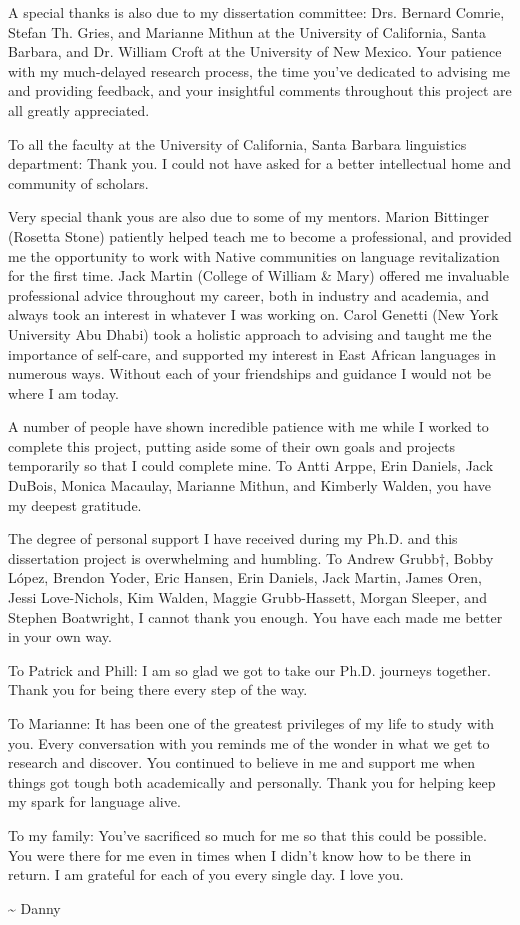 A special thanks is also due to my dissertation committee: Drs. Bernard Comrie, Stefan Th. Gries, and Marianne Mithun at the University of California, Santa Barbara, and Dr. William Croft at the University of New Mexico. Your patience with my much-delayed research process, the time you've dedicated to advising me and providing feedback, and your insightful comments throughout this project are all greatly appreciated.

To all the faculty at the University of California, Santa Barbara linguistics department: Thank you. I could not have asked for a better intellectual home and community of scholars.

Very special thank yous are also due to some of my mentors. Marion Bittinger (Rosetta Stone) patiently helped teach me to become a professional, and provided me the opportunity to work with Native communities on language revitalization for the first time. Jack Martin (College of William \& Mary) offered me invaluable professional advice throughout my career, both in industry and academia, and always took an interest in whatever I was working on. Carol Genetti (New York University Abu Dhabi) took a holistic approach to advising and taught me the importance of self-care, and supported my interest in East African languages in numerous ways. Without each of your friendships and guidance I would not be where I am today.

A number of people have shown incredible patience with me while I worked to complete this project, putting aside some of their own goals and projects temporarily so that I could complete mine. To Antti Arppe, Erin Daniels, Jack DuBois, Monica Macaulay, Marianne Mithun, and Kimberly Walden, you have my deepest gratitude.

The degree of personal support I have received during my Ph.D. and this dissertation project is overwhelming and humbling. To Andrew Grubb†, Bobby López, Brendon Yoder, Eric Hansen, Erin Daniels, Jack Martin, James Oren, Jessi Love-Nichols, Kim Walden, Maggie Grubb-Hassett, Morgan Sleeper, and Stephen Boatwright, I cannot thank you enough. You have each made me better in your own way.

To Patrick and Phill: I am so glad we got to take our Ph.D. journeys together. Thank you for being there every step of the way.

To Marianne: It has been one of the greatest privileges of my life to study with you. Every conversation with you reminds me of the wonder in what we get to research and discover. You continued to believe in me and support me when things got tough both academically and personally. Thank you for helping keep my spark for language alive.

To my family: You've sacrificed so much for me so that this could be possible. You were there for me even in times when I didn't know how to be there in return. I am grateful for each of you every single day. I love you.

\hfill\textasciitilde{ }Danny

\doublespacing
